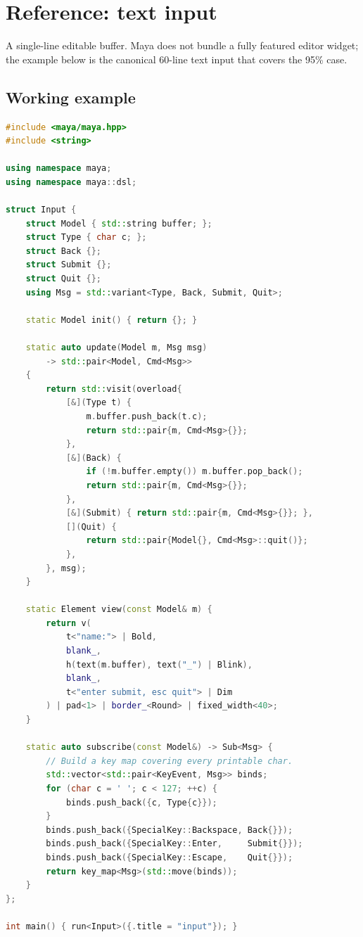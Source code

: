 \chapter{Reference: text input}
\label{ch:refman-input}

\begin{aside}
A single-line editable buffer. Maya does not bundle a fully
featured editor widget; the example below is the canonical
60-line text input that covers the 95\% case.
\end{aside}

\section{Working example}

\begin{lstlisting}[language=C++]
#include <maya/maya.hpp>
#include <string>

using namespace maya;
using namespace maya::dsl;

struct Input {
    struct Model { std::string buffer; };
    struct Type { char c; };
    struct Back {};
    struct Submit {};
    struct Quit {};
    using Msg = std::variant<Type, Back, Submit, Quit>;

    static Model init() { return {}; }

    static auto update(Model m, Msg msg)
        -> std::pair<Model, Cmd<Msg>>
    {
        return std::visit(overload{
            [&](Type t) {
                m.buffer.push_back(t.c);
                return std::pair{m, Cmd<Msg>{}};
            },
            [&](Back) {
                if (!m.buffer.empty()) m.buffer.pop_back();
                return std::pair{m, Cmd<Msg>{}};
            },
            [&](Submit) { return std::pair{m, Cmd<Msg>{}}; },
            [](Quit) {
                return std::pair{Model{}, Cmd<Msg>::quit()};
            },
        }, msg);
    }

    static Element view(const Model& m) {
        return v(
            t<"name:"> | Bold,
            blank_,
            h(text(m.buffer), text("_") | Blink),
            blank_,
            t<"enter submit, esc quit"> | Dim
        ) | pad<1> | border_<Round> | fixed_width<40>;
    }

    static auto subscribe(const Model&) -> Sub<Msg> {
        // Build a key map covering every printable char.
        std::vector<std::pair<KeyEvent, Msg>> binds;
        for (char c = ' '; c < 127; ++c) {
            binds.push_back({c, Type{c}});
        }
        binds.push_back({SpecialKey::Backspace, Back{}});
        binds.push_back({SpecialKey::Enter,     Submit{}});
        binds.push_back({SpecialKey::Escape,    Quit{}});
        return key_map<Msg>(std::move(binds));
    }
};

int main() { run<Input>({.title = "input"}); }
\end{lstlisting}

